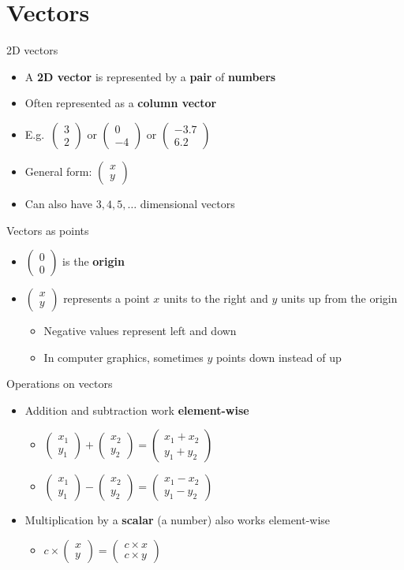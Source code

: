 \part{Vectors}
\frame{\partpage}

\newcommand{\cvec}[2]{\begin{pmatrix}#1\\#2\end{pmatrix}}

\begin{frame}{2D vectors}
    \begin{itemize}
        \pause\item A \textbf{2D vector} is represented by a \textbf{pair} of \textbf{numbers}
        \pause\item Often represented as a \textbf{column vector}
        \pause\item E.g.\ $\cvec{3}{2}$ or $\cvec{0}{-4}$ or $\cvec{-3.7}{6.2}$
        \pause\item General form: $\cvec{x}{y}$
        \pause\item Can also have $3, 4, 5, \dots$ dimensional vectors
    \end{itemize}
\end{frame}

\begin{frame}{Vectors as points}
    \begin{itemize}
        \pause\item $\cvec{0}{0}$ is the \textbf{origin}
        \pause\item $\cvec{x}{y}$ represents a point $x$ units to the right and $y$ units up from the origin
            \begin{itemize}
                \pause\item Negative values represent left and down
                \pause\item In computer graphics, sometimes $y$ points down instead of up
            \end{itemize}
    \end{itemize}
\end{frame}

\begin{frame}{Operations on vectors}
    \begin{itemize}
        \pause\item Addition and subtraction work \textbf{element-wise}
            \begin{itemize}
                \pause\item $\cvec{x_1}{y_1} + \cvec{x_2}{y_2} = \cvec{x_1+x_2}{y_1+y_2}$
                \pause\item $\cvec{x_1}{y_1} - \cvec{x_2}{y_2} = \cvec{x_1-x_2}{y_1-y_2}$
            \end{itemize}
        \pause\item Multiplication by a \textbf{scalar} (a number) also works element-wise
            \begin{itemize}
                \pause\item $c \times \cvec{x}{y} = \cvec{c \times x}{c \times y}$
            \end{itemize}
    \end{itemize}
\end{frame}

